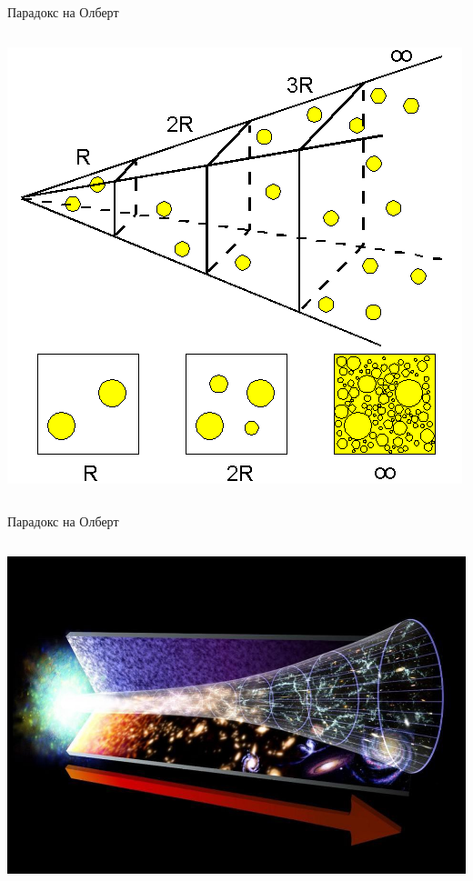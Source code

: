 \documentclass[10pt,a4paper]{beamer}
\begin{document}
        \begin{frame}{ Парадокс на Олберт }
            \begin{columns}
                \begin{column}{0.5\textwidth}
                    \includegraphics[width=\textwidth]{images/olbers_paradox.png}
                \end{column}
            \end{columns}
        \end{frame}
        
        \begin{frame}{ Парадокс на Олберт }
            \begin{columns}
                \begin{column}{0.5\textwidth}
                    \includegraphics[width=\textwidth]{images/big_bang_theory.jpeg}
                \end{column}
            \end{columns}
        \end{frame}
        
\end{document}
